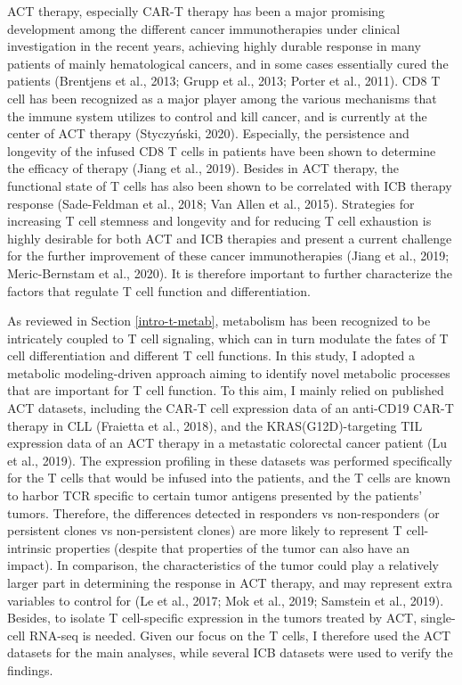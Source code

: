 \documentclass[12pt,twoside,openany,\mydriver]{thesis}  %
\begin{document}
ACT therapy, especially CAR-T therapy has been a major promising development among the different cancer immunotherapies under clinical investigation in the recent years, achieving highly durable response in many patients of mainly hematological cancers, and in some cases essentially cured the patients (Brentjens et al., 2013; Grupp et al., 2013; Porter et al., 2011). CD8 T cell has been recognized as a major player among the various mechanisms that the immune system utilizes to control and kill cancer, and is currently at the center of ACT therapy (Styczyński, 2020). Especially, the persistence and longevity of the infused CD8 T cells in patients have been shown to determine the efficacy of therapy (Jiang et al., 2019). Besides in ACT therapy, the functional state of T cells has also been shown to be correlated with ICB therapy response (Sade-Feldman et al., 2018; Van Allen et al., 2015). Strategies for increasing T cell stemness and longevity and for reducing T cell exhaustion is highly desirable for both ACT and ICB therapies and present a current challenge for the further improvement of these cancer immunotherapies (Jiang et al., 2019; Meric-Bernstam et al., 2020). It is therefore important to further characterize the factors that regulate T cell function and differentiation.

As reviewed in Section \ref{intro-t-metab}, metabolism has been recognized to be intricately coupled to T cell signaling, which can in turn modulate the fates of T cell differentiation and different T cell functions. In this study, I adopted a metabolic modeling-driven approach aiming to identify novel metabolic processes that are important for T cell function. To this aim, I mainly relied on published ACT datasets, including the CAR-T cell expression data of an anti-CD19 CAR-T therapy in CLL (Fraietta et al., 2018), and the KRAS(G12D)-targeting TIL expression data of an ACT therapy in a metastatic colorectal cancer patient (Lu et al., 2019). The expression profiling in these datasets was performed specifically for the T cells that would be infused into the patients, and the T cells are known to harbor TCR specific to certain tumor antigens presented by the patients' tumors. Therefore, the differences detected in responders vs non-responders (or persistent clones vs non-persistent clones) are more likely to represent T cell-intrinsic properties (despite that properties of the tumor can also have an impact). In comparison, the characteristics of the tumor could play a relatively larger part in determining the response in ACT therapy, and may represent extra variables to control for (Le et al., 2017; Mok et al., 2019; Samstein et al., 2019). Besides, to isolate T cell-specific expression in the tumors treated by ACT, single-cell RNA-seq is needed. Given our focus on the T cells, I therefore used the ACT datasets for the main analyses, while several ICB datasets were used to verify the findings.
\end{document}
